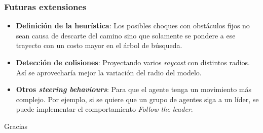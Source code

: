 \documentclass[hyperref={pdfpagelayout=SinglePage}]{beamer}
\begin{document}
\begin{frame}
\frametitle{Futuras extensiones}
\begin{itemize}
\item \textbf{Definición de la heurística}: Los posibles choques con obstáculos fijos no sean causa de descarte del camino sino que solamente se pondere a ese trayecto con un costo mayor en el árbol de búsqueda.
\item \textbf{Detección de colisiones}: Proyectando varios \textit{raycast} con distintos radios. Así se aprovecharía mejor la variación del radio del modelo.
\item \textbf{Otros \textit{steering behaviours}}: Para que el agente tenga un movimiento más complejo. Por ejemplo, si se quiere que un grupo de agentes siga a un líder, se puede implementar el comportamiento \textit{Follow the leader}. 

\end{itemize}	
\end{frame} 

\begin{frame}[plain]
    \centering
	\Huge Gracias
\end{frame}
\end{document}
